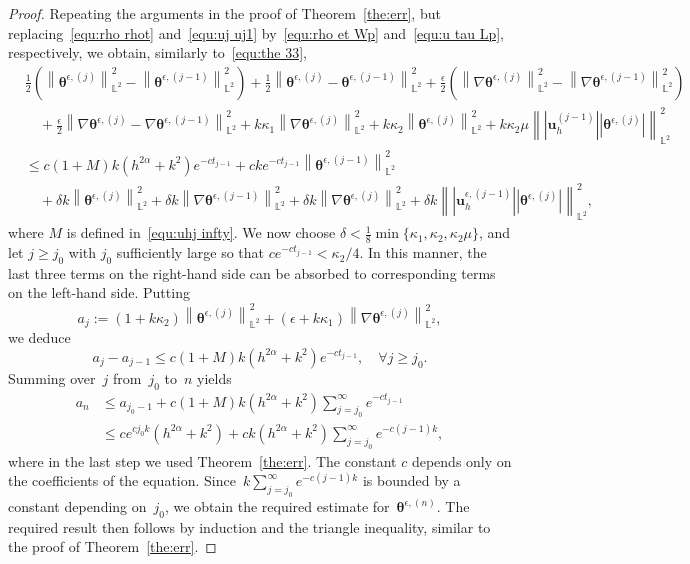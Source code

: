 \documentclass[11pt,reqno]{amsart}
\theoremstyle{definition}
\numberwithin{equation}{section}
\newcommand{\bff}{\boldsymbol}
\newcommand{\bb}{\mathbb}
\newcommand{\nn}{\nonumber}
\newcommand{\norm}[2]{\left\|{#1}\right\|_{#2}}
\newcommand{\abs}[1]{\left|{#1}\right|}
\begin{document}
\begin{proof}
	Repeating the arguments in the proof of Theorem~\ref{the:err}, but
	replacing~\eqref{equ:rho rhot} and~\eqref{equ:uj uj1} by~\eqref{equ:rho
	et Wp} and~\eqref{equ:u tau Lp}, respectively, we obtain, similarly
	to~\eqref{equ:the 33},
	\begin{align*}
		&\frac{1}{2} \left(\norm{\bff{\theta}^{\epsilon, (j)}}{\bb{L}^2}^2 - \norm{\bff{\theta}^{\epsilon, (j-1)}}{\bb{L}^2}^2\right)
		+
		\frac{1}{2} \norm{\bff{\theta}^{\epsilon, (j)}- \bff{\theta}^{\epsilon, (j-1)}}{\bb{L}^2}^2
			+
		\frac{\epsilon}{2} \left(\norm{\nabla \bff{\theta}^{\epsilon, (j)}}{\bb{L}^2}^2 - \norm{\nabla \bff{\theta}^{\epsilon, (j-1)}}{\bb{L}^2}^2\right)
		\nn \\
		&\quad
		+
		\frac{\epsilon}{2} \norm{\nabla \bff{\theta}^{\epsilon, (j)}- \nabla \bff{\theta}^{\epsilon, (j-1)}}{\bb{L}^2}^2
		+
		k\kappa_1 \norm{\nabla \bff{\theta}^{\epsilon, (j)}}{\bb{L}^2}^2
		+
		k\kappa_2 \norm{\bff{\theta}^{\epsilon, (j)}}{\bb{L}^2}^2
		+
		k\kappa_2\mu \norm{\abs{\bff{u}_h^{(j-1)}} \abs{\bff{\theta}^{\epsilon, (j)}}}{\bb{L}^2}^2
		\\
		&\leq
		c(1+M)k(h^{2\alpha}+k^2) e^{-c t_{j-1}}
		+ 
		cke^{-c t_{j-1}} \norm{\bff{\theta}^{\epsilon, (j-1)}}{\bb{L}^2}^2
		\\
		&\quad
		+
		\delta k \norm{\bff{\theta}^{\epsilon, (j)}}{\bb{L}^2}^2
		+
		\delta k \norm{\nabla \bff{\theta}^{\epsilon, (j-1)}}{\bb{L}^2}^2
		+
		\delta k \norm{\nabla \bff{\theta}^{\epsilon, (j)}}{\bb{L}^2}^2
		+
		\delta k \norm{\abs{\bff{u}_h^{\epsilon, (j-1)}} \abs{\bff{\theta}^{\epsilon, (j)}}}{\bb{L}^2}^2,
	\end{align*}
	where $M$ is defined in~\eqref{equ:uhj infty}.
	We now choose $\delta< \frac{1}{8} \min\{\kappa_1,\kappa_2, \kappa_2\mu\}$, and let $j\geq j_0$ with
	$j_0$ sufficiently large so that $ce^{-ct_{j-1}}<\kappa_2/4$. In this manner, the last three terms on the right-hand
	side can be absorbed to corresponding terms on the left-hand side.
	Putting
	\[
	a_j:= 
	(1+k\kappa_2) \norm{\bff{\theta}^{\epsilon, (j)}}{\bb{L}^2}^2
	+ 
	(\epsilon+k\kappa_1) \norm{\nabla \bff{\theta}^{\epsilon, (j)}}{\bb{L}^2}^2,
	\]
	we deduce
	\[
		a_j - a_{j-1}
		\le
		c(1+M) k (h^{2\alpha}+k^2) e^{-ct_{j-1}},
		\quad \forall j \ge j_0.
	\]
	Summing over~$j$ from~$j_0$ to~$n$ yields
	\begin{align*}
		a_n
		&\le
		a_{j_0-1} 
		+ 
		c(1+M) k(h^{2\alpha}+k^2) \sum_{j=j_0}^{\infty} e^{-ct_{j-1}}
		\\
		&\le 
		ce^{cj_0 k} (h^{2\alpha}+k^2)
		+ 
		ck(h^{2\alpha}+k^2) \sum_{j=j_0}^{\infty} e^{-c(j-1)k},
	\end{align*}
	where in the last step we used Theorem~\ref{the:err}.
	The constant $c$ depends only on
	the coefficients of the equation. Since~$k\sum_{j=j_0}^{\infty}
	e^{-c(j-1)k}$ is bounded by a constant depending on~$j_0$, we obtain the
	required estimate for~$\bff{\theta}^{\epsilon, (n)}$. The required result then
	follows by induction and the triangle inequality, similar to the proof of Theorem~\ref{the:err}.
\end{proof}
\end{document}
